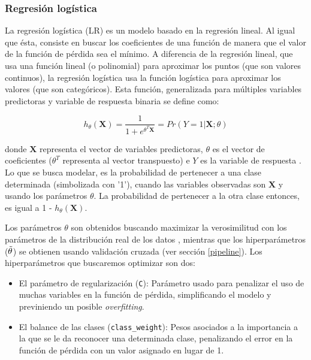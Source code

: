 \subsubsection{Regresión logística}

La regresión logística (LR) es un modelo basado en la regresión lineal. Al igual que ésta, consiste en buscar los coeficientes de una función de manera que el valor de la función de pérdida sea el mínimo. A diferencia de la regresión lineal, que usa una función lineal (o polinomial) para aproximar los puntos (que son valores continuos), la regresión logística usa la función logística para aproximar los valores (que son categóricos). Esta función, generalizada para múltiples variables predictoras y variable de respuesta binaria se define como:

\begin{equation*}
h_{\theta}(\boldsymbol{X}) = \frac{1}{1 + e^{\theta^{T}\boldsymbol{X}}} = Pr(Y = 1 | \boldsymbol{X}; \theta)
\end{equation*}

donde $\boldsymbol{X}$ representa el vector de variables predictoras, $\theta$ es el vector de coeficientes ($\theta^{T}$ representa al vector transpuesto) e $Y$ es la variable de respuesta \cite{Barber2011}. Lo que se busca modelar, es la probabilidad de pertenecer a una clase determinada (simbolizada con '1'), cuando las variables observadas son $\boldsymbol{X}$ y usando los parámetros $\theta$. La probabilidad de pertenecer a la otra clase entonces, es igual a 1 - $h_{\theta}(\boldsymbol{X})$. 

Los parámetros $\theta$ son obtenidos buscando maximizar la verosimilitud con los parámetros de la distribución real de los datos \cite{Hastie2001}, mientras que los hiperparámetros ($\Tilde{\theta}$) se obtienen usando validación cruzada (ver sección \ref{pipeline}). Los hiperparámetros que buscaremos optimizar son dos:

\begin{itemize}
    \item El parámetro de regularización (\texttt{C}): Parámetro usado para penalizar el uso de muchas variables en la función de pérdida, simplificando el modelo y previniendo un posible \textit{overfitting}.
    \item El balance de las clases (\texttt{class\_weight}): Pesos asociados a la importancia a la que se le da reconocer una determinada clase, penalizando el error en la función de pérdida con un valor asignado en lugar de 1. 
\end{itemize}

